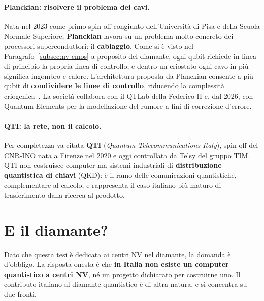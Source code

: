 \paragraph{Planckian: risolvere il problema dei cavi.}
Nata nel 2023 come primo spin-off congiunto dell'Università di Pisa e della
Scuola Normale Superiore, \textbf{Planckian} lavora su un problema molto
concreto dei processori superconduttori: il \textbf{cablaggio}. Come si è
visto nel Paragrafo~\ref{subsec:nv-cmos} a proposito del diamante, ogni qubit
richiede in linea di principio la propria linea di controllo, e dentro un
criostato ogni cavo in più significa ingombro e calore. L'architettura
proposta da Planckian consente a più qubit di \textbf{condividere le linee di
controllo}, riducendo la complessità criogenica~\cite{planckian2026}. La
società collabora con il QTLab della Federico II e, dal 2026, con Quantum
Elements per la modellazione del rumore a fini di correzione d'errore.

\paragraph{QTI: la rete, non il calcolo.}
Per completezza va citata \textbf{QTI} (\textit{Quantum Telecommunications
Italy}), spin-off del CNR-INO nata a Firenze nel 2020 e oggi controllata da
Telsy del gruppo TIM. QTI non costruisce computer ma sistemi industriali di
\textbf{distribuzione quantistica di chiavi} (QKD): è il ramo delle
comunicazioni quantistiche, complementare al calcolo, e rappresenta il caso
italiano più maturo di trasferimento dalla ricerca al prodotto.

\section{E il diamante?}
\label{sec:it-diamante}

Dato che questa tesi è dedicata ai centri NV nel diamante, la domanda è
d'obbligo. La risposta onesta è che \textbf{in Italia non esiste un computer
quantistico a centri NV}, né un progetto dichiarato per costruirne uno. Il
contributo italiano al diamante quantistico è di altra natura, e si concentra
su due fronti.

